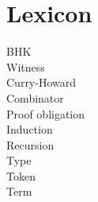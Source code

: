 \chapter{Lexicon}

\begin{description}
\item [BHK]
\item [Witness]
\item [Curry-Howard]
\item [Combinator]
\item [Proof obligation]
\item [Induction]
\item [Recursion]
\item [Type]
\item [Token]
\item [Term]
\end{description}

